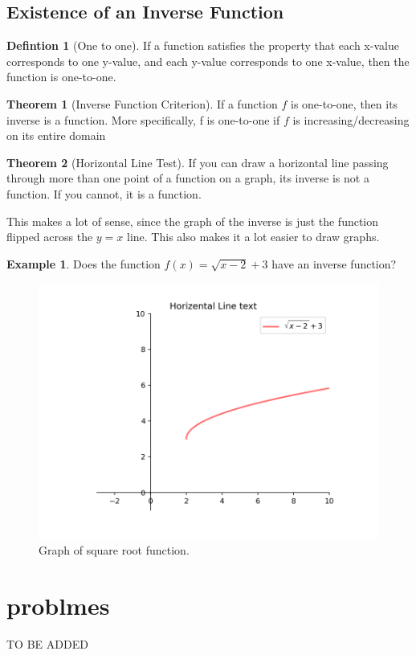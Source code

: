 \documentclass[a4paper]{article}
\theoremstyle{definition}
\newtheorem{definition}{Defintion}[section]
\newtheorem{exmp}{Example}[section]
\newtheorem{theorem}{Theorem}
\begin{document}
\subsection{Existence of an Inverse Function}
\begin{definition}[One to one]
    If a function satisfies the property that each x-value corresponds to one y-value, and
    each y-value corresponds to one x-value, then the function is one-to-one.
\end{definition}
\begin{theorem}[Inverse Function Criterion]
    If a function \(f\) is one-to-one, then its inverse is a function. More specifically, f is
    one-to-one if \(f\) is increasing/decreasing on its entire domain
\end{theorem}
\begin{theorem}[Horizontal Line Test]
    If you can draw a horizontal line passing through more than one point of a function
    on a graph, its inverse is not a function. If you cannot, it is a function.
\end{theorem}
This makes a lot of sense, since the graph of the inverse is just the function flipped
across the \(y = x\) line. This also makes it a lot easier to draw graphs.

\begin{exmp}
    Does the function \(f(x) = \sqrt{x-2} + 3\) have an inverse function?

    \begin{figure}[H]
        \begin{small}
            \begin{center}
                \includegraphics[width=0.75 \textwidth]{../out/inverse.png}
            \end{center}
            \caption{Graph of square root function.}
            \label{fig: invetable Function}

        \end{small}
    \end{figure}
\end{exmp}
\section{problmes}
TO BE ADDED 
\end{document}
